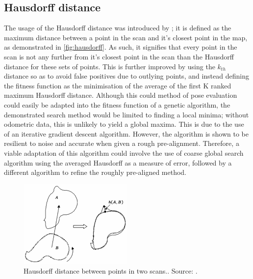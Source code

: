 \documentclass[authoryearcitations]{UoYCSproject}
\begin{document}
\subsection{Hausdorff distance}
The usage of the Hausdorff distance was introduced by \citet{Donoso-Aguirre2008-pb}; it is defined as the maximum distance between a point in the scan and it's closest point in the map, as demonstrated in \autoref{fig:hausdorff}. As such, it signifies that every point in the scan is not any further from it's closest point in the scan than the Hausdorff distance for these sets of points. This is further improved by using the $k_{th}$ distance so as to avoid false positives due to outlying points, and instead defining the fitness function as the minimisation of the average of the first K ranked maximum Hausdorff distance. Although this could method of pose evaluation could easily be adapted into the fitness function of a genetic algorithm, the demonstrated search method would be limited to finding a local minima; without odometric data, this is unlikely to yield a global maxima. This is due to the use of an iterative gradient descent algorithm. However, the algorithm is shown to be resilient to noise and accurate when given a rough pre-alignment. Therefore, a viable adaptation of this algorithm could involve the use of coarse global search algorithm using the averaged Hausdorff as a measure of error, followed by a different algorithm to refine the roughly pre-aligned method.

\begin{figure}[t]
	\centering
	\includegraphics[width=0.5\textwidth,keepaspectratio]{images/hausdorff.png}

	\caption[Hausdorff distance]{Hausdorff distance between points in two scans.. Source: \citet{Donoso-Aguirre2008-pb}.}
	\label{fig:hausdorff}
\end{figure}
\end{document}
